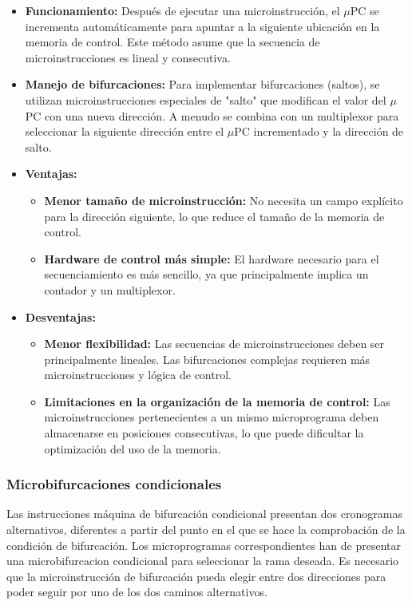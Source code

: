 \begin{itemize}
    \item \textbf{Funcionamiento:} Después de ejecutar una microinstrucción, el $\mu$PC se incrementa automáticamente para apuntar a la siguiente ubicación en la memoria de control. Este método asume que la secuencia de microinstrucciones es lineal y consecutiva.
    \item \textbf{Manejo de bifurcaciones:} Para implementar bifurcaciones (saltos), se utilizan microinstrucciones especiales de "salto" que modifican el valor del $\mu$PC con una nueva dirección. A menudo se combina con un multiplexor para seleccionar la siguiente dirección entre el $\mu$PC incrementado y la dirección de salto.
    \item \textbf{Ventajas:}
        \begin{itemize}
            \item \textbf{Menor tamaño de microinstrucción:} No necesita un campo explícito para la dirección siguiente, lo que reduce el tamaño de la memoria de control.
            \item \textbf{Hardware de control más simple:} El hardware necesario para el secuenciamiento es más sencillo, ya que principalmente implica un contador y un multiplexor.
        \end{itemize}
    \item \textbf{Desventajas:}
        \begin{itemize}
            \item \textbf{Menor flexibilidad:} Las secuencias de microinstrucciones deben ser principalmente lineales. Las bifurcaciones complejas requieren más microinstrucciones y lógica de control.
            \item \textbf{Limitaciones en la organización de la memoria de control:} Las microinstrucciones pertenecientes a un mismo microprograma deben almacenarse en posiciones consecutivas, lo que puede dificultar la optimización del uso de la memoria.
        \end{itemize}
\end{itemize}
\begin{center}
    
\end{center}
\subsubsection*{Microbifurcaciones condicionales}
Las instrucciones máquina de bifurcación condicional presentan dos cronogramas alternativos, diferentes a partir del punto en el que se hace la comprobación de la condición de bifurcación. Los microprogramas correspondientes han de presentar una microbifurcacion condicional 
para seleccionar la rama deseada. Es necesario que la microinstrucción de bifurcación pueda elegir entre dos direcciones para poder seguir por uno de los dos caminos alternativos.

